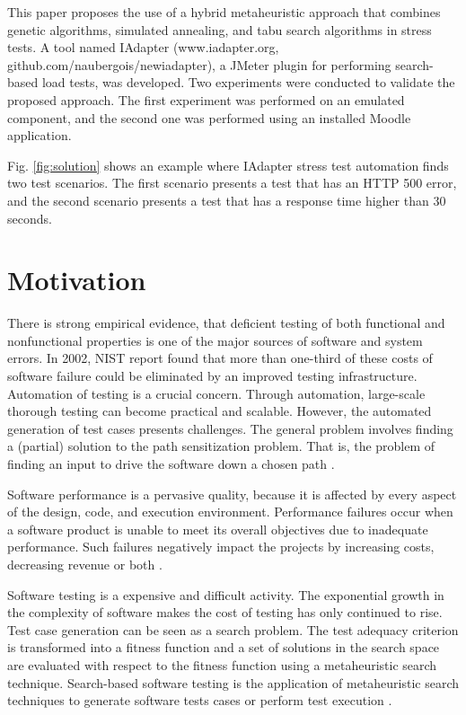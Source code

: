 This paper proposes the use of a hybrid metaheuristic approach that combines genetic algorithms, simulated annealing, and tabu search algorithms in stress tests. A tool named IAdapter (www.iadapter.org, github.com/naubergois/newiadapter), a JMeter plugin for performing search-based load tests, was developed. Two experiments were conducted to validate the proposed approach. The first experiment was performed on an emulated component, and the second one was performed using an installed Moodle application.

Fig. \ref{fig:solution} shows an example where IAdapter stress test automation finds two test scenarios. The first scenario presents a test that has an HTTP 500 error, and the second scenario presents a test that has a response time higher than 30 seconds. 


\section{Motivation}

There is strong empirical evidence, that deficient
testing of both functional and nonfunctional properties
is one of the major sources of software and system errors. In 2002, NIST  report found that more than one-third of these costs of software failure could be eliminated by an improved testing infrastructure.
Automation of testing is a crucial concern. Through
automation, large-scale thorough testing can become
practical and scalable. However, the automated generation of test cases presents challenges. The general problem involves finding a (partial) solution to the path sensitization problem. That is, the problem of finding an input to drive the software down a chosen path \cite{Harman2010} \cite{dean2003managing}. 

Software performance is a pervasive quality, because it is affected by every aspect of the design, code, and execution environment. Performance failures occur when a software product is unable to meet its overall objectives due to inadequate performance. Such failures negatively impact the projects by increasing costs, decreasing revenue or both \cite{Vetoio2011}. 

Software testing is a expensive and difficult activity. The exponential
growth in the complexity of software makes the cost of testing has only continued to rise. Test case generation can be seen as a search problem. The test adequacy criterion is transformed into a fitness function and a set of solutions in the search
space are evaluated with respect to the fitness function using a metaheuristic search technique. Search-based software testing is the application of metaheuristic search techniques to generate software
tests cases or perform test execution \cite{Afzal2009a} \cite{Gay}.


